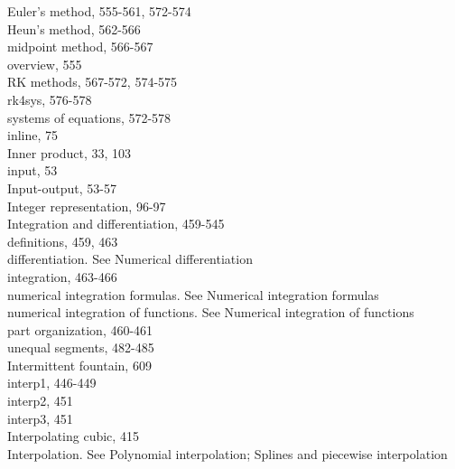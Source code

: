 \documentclass[../main.tex]{subfiles}
\begin{document}
\begin{multicols}{3}
    \hspace*{3mm}Euler's method, 555-561, 572-574\\
    \hspace*{3mm}Heun's method, 562-566\\
    \hspace*{3mm}midpoint method, 566-567\\
    \hspace*{3mm}overview, 555\\
    \hspace*{3mm}RK methods, 567-572, 574-575\\
    \hspace*{3mm}rk4sys, 576-578\\
    \hspace*{3mm}systems of equations, 572-578\\
    inline, 75\\
    Inner product, 33, 103\\
    input, 53\\
    Input-output, 53-57\\
    Integer representation, 96-97\\
    Integration and differentiation, 459-545\\
    \hspace*{3mm}definitions, 459, 463\\
    \hspace*{3mm}differentiation. See Numerical differentiation\\
    \hspace*{3mm}integration, 463-466\\
    \hspace*{3mm}numerical integration formulas. See Numerical integration formulas\\
    \hspace*{3mm}numerical integration of functions. See Numerical integration of functions\\
    \hspace*{3mm}part organization, 460-461\\
    \hspace*{3mm}unequal segments, 482-485\\
    Intermittent fountain, 609\\
    interp1, 446-449\\
    interp2, 451\\
    interp3, 451\\
    Interpolating cubic, 415\\
    Interpolation. See Polynomial interpolation; Splines and piecewise interpolation\\

\end{multicols}
\end{document}
